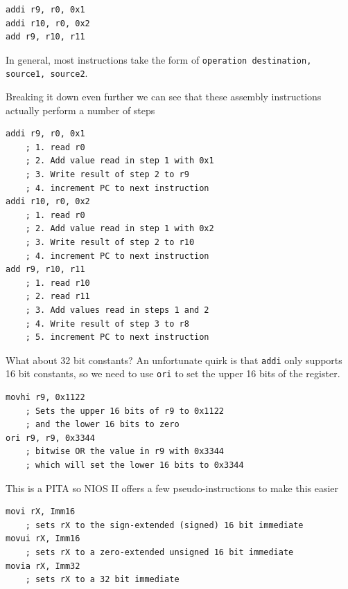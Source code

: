\documentclass[10pt]{article}
\begin{document}

\begin{listing}[H]
\begin{verbatim}
addi r9, r0, 0x1
addi r10, r0, 0x2
add r9, r10, r11
\end{verbatim}
\end{listing}

In general, most instructions take the form of \texttt{operation destination, source1, source2}.


Breaking it down even further we can see that these assembly instructions actually perform a number of steps

\begin{listing}[H]
\begin{verbatim}
addi r9, r0, 0x1
	; 1. read r0
	; 2. Add value read in step 1 with 0x1
	; 3. Write result of step 2 to r9
	; 4. increment PC to next instruction
addi r10, r0, 0x2
	; 1. read r0
	; 2. Add value read in step 1 with 0x2
	; 3. Write result of step 2 to r10
	; 4. increment PC to next instruction
add r9, r10, r11
	; 1. read r10
	; 2. read r11
	; 3. Add values read in steps 1 and 2
	; 4. Write result of step 3 to r8
	; 5. increment PC to next instruction
\end{verbatim}
\end{listing}


What about 32 bit constants? An unfortunate quirk is that \texttt{addi} only supports 16 bit constants, so we need to use \texttt{ori} to set the upper 16 bits of the register.


\begin{listing}[H]
\begin{verbatim}
movhi r9, 0x1122
	; Sets the upper 16 bits of r9 to 0x1122
	; and the lower 16 bits to zero
ori r9, r9, 0x3344
	; bitwise OR the value in r9 with 0x3344
	; which will set the lower 16 bits to 0x3344
\end{verbatim}
\end{listing}

This is a PITA so NIOS II offers a few pseudo-instructions to make this easier




\begin{listing}[H]
\begin{verbatim}
movi rX, Imm16
	; sets rX to the sign-extended (signed) 16 bit immediate
movui rX, Imm16
	; sets rX to a zero-extended unsigned 16 bit immediate
movia rX, Imm32
	; sets rX to a 32 bit immediate
\end{verbatim}
\end{listing}
\end{document}
